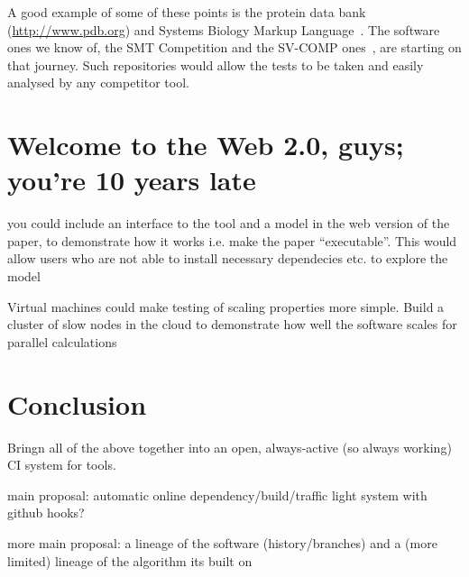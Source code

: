 \documentclass[conference]{IEEEtran}
\begin{document}
A good example of some of these points is the protein data bank
(\url{http://www.pdb.org}) and Systems Biology Markup
Language~\cite{Hucka2003,Chaouiya2013}. The software ones we know of,
the SMT Competition and the SV-COMP ones~\cite{SMTComp, SVCOMP}, are
starting on that journey. Such repositories would allow the tests to
be taken and easily analysed by any competitor tool. 

\section{Welcome to the Web 2.0, guys; you're 10 years late} 

you could include an interface to the tool and a model in the web
version of the paper, to demonstrate how it works i.e. make the paper
``executable''. This would allow users who are not able to install
necessary dependecies etc. to explore the model \cite{Hall2014}

Virtual machines could make testing of scaling properties more simple. 
Build a cluster of slow nodes in the cloud to demonstrate how well the
software scales for parallel calculations


\section{Conclusion}

Bringn all of the above together into an open, always-active (so always working) CI
system for tools. 

main proposal: automatic online dependency/build/traffic light system
with github hooks?

more main proposal: a lineage of the software (history/branches) and a
(more limited) lineage of the algorithm its built on





\end{document}

